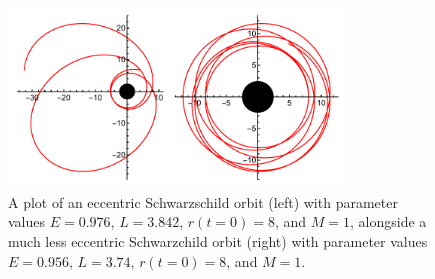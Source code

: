 \begin{figure}[!ht]
    \centering
    \includegraphics[width=0.8\textwidth]{images/schwarzSymmetry.pdf}
    \caption[Example of an eccentric and a comparatively far less eccentric Schwarzschild orbit]{A plot of an eccentric Schwarzschild orbit (left) with parameter values $E=0.976$, $L=3.842$, $r(t=0)=8$, and $M=1$, alongside a much less eccentric Schwarzchild orbit (right) with parameter values $E=0.956$, $L=3.74$, $r(t=0)=8$, and $M=1$.}
    \label{fig:symOrbits}
\end{figure}


